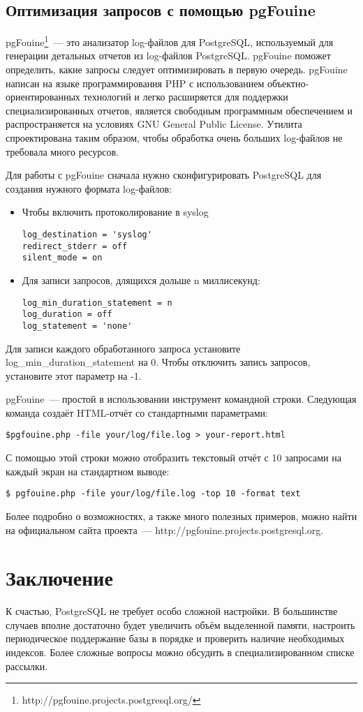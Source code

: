 \subsection{Оптимизация запросов с помощью pgFouine}
pgFouine\footnote{http://pgfouine.projects.postgresql.org/}~--- это 
анализатор log-файлов для PostgreSQL, используемый для генерации детальных отчетов из 
log-файлов PostgreSQL. pgFouine поможет определить, какие запросы следует оптимизировать в первую очередь.
pgFouine написан на языке программирования PHP с использованием объектно-ориентированных технологий и легко 
расширяется для поддержки специализированных отчетов, является свободным программным обеспечением и 
распространяется на условиях GNU General Public License. Утилита спроектирована таким образом, чтобы обработка 
очень больших log-файлов не требовала много ресурсов.

Для работы с pgFouine сначала нужно сконфигурировать PostgreSQL для создания нужного формата log-файлов:
\begin{itemize}
\item Чтобы включить протоколирование в syslog
\begin{verbatim}
log_destination = 'syslog'
redirect_stderr = off
silent_mode = on
\end{verbatim}
\item Для записи запросов, длящихся дольше n миллисекунд:
\begin{verbatim}
log_min_duration_statement = n
log_duration = off
log_statement = 'none'
\end{verbatim}
\end{itemize}

Для записи каждого обработанного запроса установите log\_min\_duration\_statement на 0. 
Чтобы отключить запись запросов, установите этот параметр на -1.

pgFouine~--- простой в использовании инструмент командной строки. Следующая команда создаёт 
HTML-отчёт со стандартными параметрами:
\begin{verbatim}
$pgfouine.php -file your/log/file.log > your-report.html
\end{verbatim}

С помощью этой строки можно отобразить текстовый отчёт с 10 запросами на каждый экран на стандартном выводе:
\begin{verbatim}
$ pgfouine.php -file your/log/file.log -top 10 -format text
\end{verbatim}

Более подробно о возможностях, а также много полезных примеров, можно найти на официальном сайта проекта~--- 
http://pgfouine.projects.postgresql.org.


\section{Заключение}
К счастью, PostgreSQL не требует особо сложной настройки. В большинстве случаев вполне достаточно будет увеличить 
объём выделенной памяти, настроить периодическое поддержание базы в порядке и проверить наличие необходимых индексов. 
Более сложные вопросы можно обсудить в специализированном списке рассылки.
